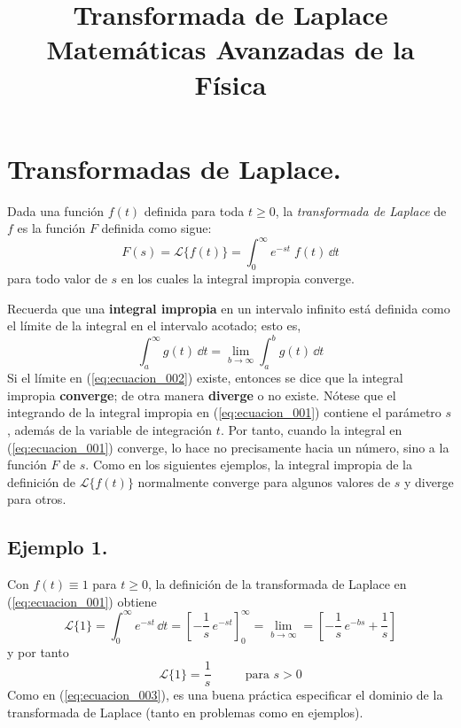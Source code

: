 
\title{Transformada de Laplace \\ {\large Matemáticas Avanzadas de la Física}}
\date{ }

\renewcommand\labelenumii{\theenumi.{\arabic{enumii}}}
\maketitle
\fontsize{14}{14}\selectfont
\section{Transformadas de Laplace.}
Dada una función $f(t)$ definida para toda $t \geq 0$, la \emph{transformada de Laplace} de $f$ es la función $F$ definida como sigue:
\begin{equation}
F(s) = \mathscr{L} \{ f(t) \} = \int_{0}^{\infty} e^{-st} \; f(t) \, \dd t
\label{eq:ecuacion_001}
\end{equation}
para todo valor de $s$ en los cuales la integral impropia converge.
\par
Recuerda que una \textbf{integral impropia} en un intervalo infinito está definida como el límite de la integral en el intervalo acotado; esto es,
\begin{equation}
\int_{a}^{\infty} g(t) \, \dd t = \lim_{b \to \infty} \int_{a}^{b} g(t) \, \dd t
\label{eq:ecuacion_002}
\end{equation}
Si el límite en (\ref{eq:ecuacion_002}) existe, entonces se dice que la integral impropia \textbf{converge}; de otra manera \textbf{diverge} o no existe. Nótese que el integrando de la integral impropia en (\ref{eq:ecuacion_001}) contiene el parámetro $s$, además de la variable de integración $t$. Por tanto, cuando la integral en (\ref{eq:ecuacion_001}) converge, lo hace no precisamente hacia un número, sino a la función $F$ de $s$. Como en los siguientes ejemplos, la integral impropia de la definición de $\mathscr{L} \{ f(t) \} $ normalmente converge para algunos valores de $s$ y diverge para otros.
\subsection*{Ejemplo 1.}
Con $f(t) \equiv 1$ para $t \geq 0$, la definición de la transformada de Laplace en (\ref{eq:ecuacion_001}) obtiene
\[ \mathscr{L} \{ 1 \} = \int_{0}^{\infty} e^{-st} \, \dd t = \left[ - \dfrac{1}{s} \, e^{-st} \right]_{0}^{\infty} = \lim_{b \to \infty} = \left[ - \dfrac{1}{s} \, e^{-bs} + \dfrac{1}{s} \right] \]
y por tanto
\begin{equation}
\mathscr{L} \{ 1 \} = \dfrac{1}{s} \hspace{1cm} \mbox{ para } s > 0
\label{eq:ecuacion_003}
\end{equation}
Como en (\ref{eq:ecuacion_003}), es una buena práctica especificar el dominio de la transformada de Laplace (tanto en problemas como en ejemplos).
